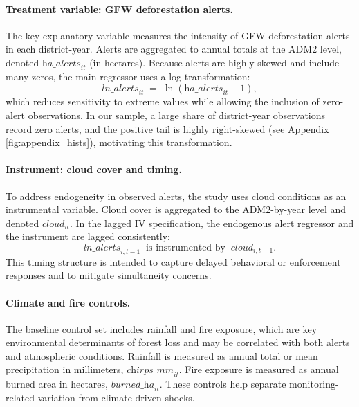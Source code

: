 \documentclass[hidelinks,12pt]{article}
\begin{document}
\paragraph{Treatment variable: GFW deforestation alerts.}

The key explanatory variable measures the intensity of GFW deforestation alerts in each district-year. Alerts are aggregated to annual totals at the ADM2 level, denoted $\textit{ha\_alerts}_{it}$ (in hectares). Because alerts are highly skewed and include many zeros, the main regressor uses a log transformation:
\begin{equation}
  \textit{ln\_alerts}_{it} \;=\; \ln\!\left(\textit{ha\_alerts}_{it} + 1\right),
\end{equation}
which reduces sensitivity to extreme values while allowing the inclusion of zero-alert observations. In our sample, a large share of district-year observations record zero alerts, and the positive tail is highly right-skewed (see Appendix \cref{fig:appendix_hists}), motivating this transformation.



\paragraph{Instrument: cloud cover and timing.}
To address endogeneity in observed alerts, the study uses cloud conditions as an instrumental variable. Cloud cover is aggregated to the ADM2-by-year level and denoted $\textit{cloud}_{it}$. In the lagged IV specification, the endogenous alert regressor and the instrument are lagged consistently:
\begin{equation}
  \textit{ln\_alerts}_{i,t-1} \;\;\text{is instrumented by}\;\; \textit{cloud}_{i,t-1}.
\end{equation}
This timing structure is intended to capture delayed behavioral or enforcement responses and to mitigate simultaneity concerns.

\paragraph{Climate and fire controls.}
The baseline control set includes rainfall and fire exposure, which are key environmental determinants of forest loss and may be correlated with both alerts and atmospheric conditions. Rainfall is measured as annual total or mean precipitation in millimeters, $\textit{chirps\_mm}_{it}$. Fire exposure is measured as annual burned area in hectares, $\textit{burned\_ha}_{it}$. These controls help separate monitoring-related variation from climate-driven shocks.
\end{document}

